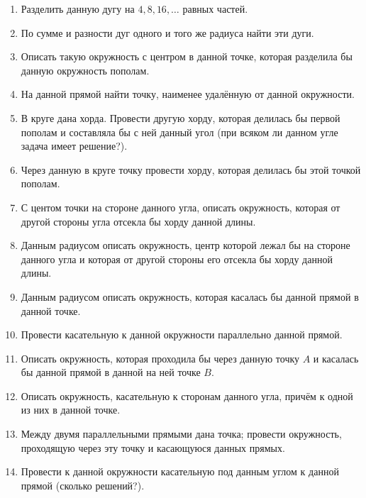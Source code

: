 \begin{enumerate}[resume]
\item
Разделить данную дугу на $4, 8, 16, \dots$
равных частей.

\item
По сумме и разности дуг одного и того же радиуса найти эти дуги.

\item
Описать такую окружность с центром в данной точке, которая разделила бы данную окружность пополам.

\item
На данной прямой найти точку, наименее удалённую от данной окружности.

\item
В круге дана хорда.
Провести другую хорду, которая делилась бы первой пополам и составляла бы с ней данный угол (при всяком ли данном угле задача имеет решение?).

\item
Через данную в круге точку провести хорду, которая делилась бы этой точкой пополам.

\item
С центом точки на стороне данного угла, описать окружность, которая от другой стороны угла отсекла бы хорду данной длины.

\item
Данным радиусом описать окружность, центр которой лежал бы на стороне данного угла и которая от другой стороны его отсекла бы хорду данной длины.

\item
Данным радиусом описать окружность, которая касалась бы данной прямой в данной точке.

\item
Провести касательную к данной окружности параллельно данной прямой.

\item
Описать окружность, которая проходила бы через данную точку $A$ и касалась бы данной прямой в данной на ней точке $B$.

\item
Описать окружность, касательную к сторонам данного угла, причём к одной из них в данной точке.

\item
Между двумя параллельными прямыми дана точка;
провести окружность, проходящую через эту точку и касающуюся данных прямых.

\item
Провести к данной окружности касательную под данным углом к данной прямой (сколько решений?).


\end{enumerate}
